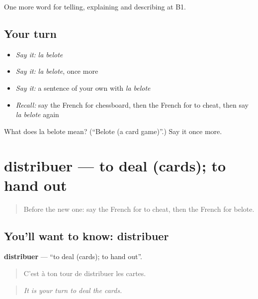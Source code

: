 \begin{grammarlens}[title={What you've built}]
One more word for telling, explaining and describing at B1.
\end{grammarlens}

\subsection*{Your turn}
\begin{itemize}
\raggedright
  \item \emph{Say it:} \emph{la belote}
  \item \emph{Say it:} \emph{la belote}, once more
  \item \emph{Say it:} a sentence of your own with \emph{la belote}
  \item \emph{Recall:} say the French for chessboard, then the French for to cheat, then say \emph{la belote} again
\end{itemize}

\begin{tcolorbox}[breakable,colback=teal!4,colframe=teal!35!black,title={Before you move on}]
What does la belote mean? (\textquotedblleft{}Belote (a card game)\textquotedblright{}.) Say it once more.
\end{tcolorbox}
\section[distribuer]{distribuer — to deal (cards); to hand out}

\label{lesson:FR-C500-distribuer}



\begin{quote}
Before the new one: say the French for to cheat, then the French for belote.
\end{quote}

\subsection*{You'll want to know: distribuer}
\textbf{distribuer} — \textquotedblleft{}to deal (cards); to hand out\textquotedblright{}.

\begin{quote}
C'est à ton tour de distribuer les cartes.
\end{quote}

\begin{quote}
\emph{It is your turn to deal the cards.}
\end{quote}

